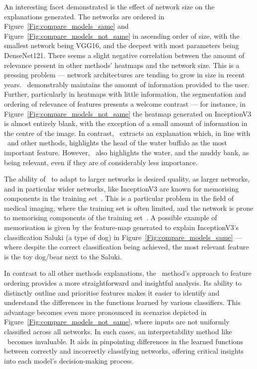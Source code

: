 An interesting facet demonstrated is the effect of network size on the explanations generated. The networks are ordered in Figure~\ref{Fig:compare_models_same} and Figure~\ref{Fig:compare_models_not_same} in ascending order of size, with the smallest network being VGG16, and the deepest with most parameters being DenseNet121. There seems a slight negative correlation between the amount of relevance present in other methods' heatmaps and the network size. This is a pressing problem --- network architectures are tending to grow in size in recent years. \CTC\ demonstrably maintains the amount of information provided to the user. Further, particularly in heatmaps with little information, the segmentation and ordering of relevance of features presents a welcome contrast --- for instance, in Figure~\ref{Fig:compare_models_not_same} the heatmap generated on InceptionV3 is almost entirely blank, with the exception of a small amount of information in the centre of the image. In contrast, \CTC\ extracts an explanation which, in line with \LRP\ and other methods, highlights the head of the water buffalo as the most important feature. However, \CTC\ also highlights the water, and the muddy bank, as being relevant, even if they are of considerably less importance.

The ability of \CTC\ to adapt to larger networks is desired quality, as larger networks, and in particular wider networks, like InceptionV3 are known for memorising components in the training set~\cite{nguyen2020wide}. This is a particular problem in the field of medical imaging, where the training set is often limited, and the network is prone to memorising components of the training set~\cite{alzubaidi2021novel}. A possible example of memorisation is given by the feature-map generated to explain InceptionV3's classification Saluki (a type of dog) in Figure~\ref{Fig:compare_models_same} --- where despite the correct classification being achieved, the most relevant feature is the toy dog/bear next to the Saluki.

In contrast to all other methods explanations, the \CTC\ method's approach to feature ordering provides a more straightforward and insightful analysis. Its ability to distinctly outline and prioritise features makes it easier to identify and understand the differences in the functions learned by various classifiers. This advantage becomes even more pronounced in scenarios depicted in Figure~\ref{Fig:compare_models_not_same}, where inputs are not uniformly classified across all networks. In such cases, an interpretability method like \CTC\ becomes invaluable. It aids in pinpointing differences in the learned functions between correctly and incorrectly classifying networks, offering critical insights into each model's decision-making process.


